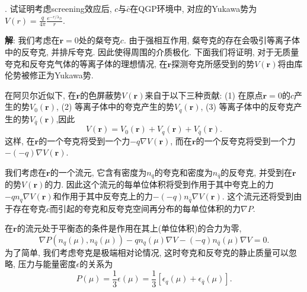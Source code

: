 \documentclass{ctexart}
\newcounter{mycnt}
\newenvironment{problem}{\noindent \stepcounter{mycnt}\themycnt.}{

}
\newenvironment{answer}{\textbf{解}:}{
\vspace{0.5cm}
}
\begin{document}
\begin{problem}
  试证明考虑screening效应后, $c$与$\bar{c}$在QGP环境中, 对应的Yukawa势为$V(r) = \frac{q}{4\pi} \frac{e^{-r/\lambda_D}}{r}$.
\end{problem}

\begin{answer}
  我们考虑在$\bm{r} = 0$处的粲夸克$c$. 由于强相互作用, 粲夸克的存在会吸引等离子体中的反夸克, 并排斥夸克. 因此使得周围的介质极化. 下面我们将证明, 对于无质量夸克和反夸克气体的等离子体的理想情况, 在$\bm{r}$探测夸克所感受到的势$V(\bm{r})$将由库伦势被修正为Yukawa势.

在阿贝尔近似下, 在$\bm{r}$的色屏蔽势$V(\bm{r})$来自于以下三种贡献: (1) 在原点$\bm{r} = 0$的$c$产生的势$V_0(\bm{r})$, (2) 等离子体中的夸克产生的势$V_q(\bm{r})$, (3) 等离子体中的反夸克产生的势$V_{\bar{q}}(\bm{r})$,因此
\begin{equation}\label{eq1}
  V(\bm{r}) = V_0(\bm{r}) + V_q(\bm{r}) + V_{\bar{q}}(\bm{r}).
\end{equation}
这样, 在$\bm{r}$的一个夸克将受到一个力$-q\nabla V(\bm{r})$, 而在$\bm{r}$的一个反夸克将受到一个力$-(-q)\nabla V(\bm{r})$.

我们考虑在$\bm{r}$的一个流元, 它含有密度为$n_q$的夸克和密度为$n_{\bar{q}}$的反夸克, 并受到在$\bm{r}$的势$V(\bm{r})$的力. 因此这个流元的每单位体积将受到作用于其中夸克上的力$-qn_q \nabla V(\bm{r})$和作用于其中反夸克上的力$-(-q)n_{\bar{q}} \nabla V(\bm{r})$. 这个流元还将受到由于存在夸克$c$而引起的夸克和反夸克空间再分布的每单位体积的力$\nabla P$.

在$\bm{r}$的流元处于平衡态的条件是作用在其上(单位体积)的合力为零,
\begin{equation}\label{eq2}
  \nabla P(n_q(\mu),n_{\bar{q}}(\mu)) - qn_q(\mu) \nabla V - (-q)n_{\bar{q}}(\mu)\nabla V = 0.
\end{equation}
为了简单, 我们考虑夸克是极端相对论情况, 这时夸克和反夸克的静止质量可以忽略, 压力与能量密度$\epsilon$的关系为
\begin{equation}\label{eq3}
  P(\mu) = \frac{1}{3} \epsilon(\mu) = \frac{1}{3} \left[ \epsilon_q(\mu) + \epsilon_{\bar{q}} (\mu) \right].
\end{equation}


\end{answer}
\end{document}
